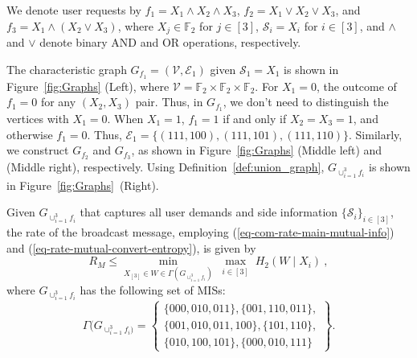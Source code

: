 \documentclass[conference, letterpaper]{IEEEtran} %
\begin{document}
\begin{ex}
\label{ex-nonlinear-comp}
We denote user requests by $f_1=X_1\wedge X_2\wedge X_3$, $f_2=X_1\vee X_2\vee X_3$, and $f_3=X_1\wedge(X_2\vee X_3)$, where $X_{j}\in\mathbb{F}_2$ for $j\in[3]$, $\mathcal{S}_{i}=X_{i}$ for $i\in [3]$, and $\wedge$ and $\vee$ denote binary AND and OR operations, respectively. 

The characteristic graph $G_{f_{1}}=(\mathcal{V},\mathcal{E}_1)$ 
given $\mathcal{S}_1=X_1$ is shown in Figure~\ref{fig:Graphs} (Left), where $\mathcal{V}=\mathbb{F}_2\times\mathbb{F}_2\times\mathbb{F}_2$. For $X_1=0$, the outcome of $f_1 =0$ for any $(X_2,X_3)$ pair. Thus, in $G_{f_{1}}$, we don't need to distinguish the vertices with $X_1=0$. When $X_1=1$, $f_1 =1$ if and only if $X_2=X_3=1$, and otherwise $f_1=0$. Thus, $\mathcal{E}_1=\{(111,100), (111,101),(111,110)\}$. 
Similarly, we construct $G_{f_{2}}$ and $G_{f_{3}}$, as shown in Figure~\ref{fig:Graphs} (Middle left) and (Middle right), respectively. Using Definition~\ref{def:union_graph},  $G_{\cup_{i=1}^{3}f_i}$ is shown in Figure~\ref{fig:Graphs}~(Right).



Given $G_{\cup_{i=1}^{3}f_i}$ that captures all user demands and side information $\{\mathcal{S}_i\}_{i\in[3]}$, the rate of the broadcast message, employing (\ref{eq-com-rate-main-mutual-info}) and (\ref{eq-rate-mutual-convert-entropy}), is given by 
\begin{equation}
\label{R-3-user}
    R_M\leq\min_{X_{[3]}\in W\in \Gamma(G_{\cup_{i=1}^{3}f_i})} \max_{{\begin{array}{c}
         i\in[3]
    \end{array}}}H_2(W\mid X_{i}) \ ,
\end{equation}
where $G_{\cup_{i=1}^{3}f_i}$ has the following set of MISs:
 \begin{equation}
 \label{Gamma-3-user}
\Gamma(G_{\cup_{i=1}^{3}f_i)}=\left\{\begin{array}{c}
       \{000,010,011\},\{001,110,011\},\\
       \{001,010,011,100\}, \{101,110\},\\ \{ 010,100,101\},
       \{000,010,111\}
  \end{array}\right\}.
  \end{equation}
    

\end{ex}
\end{document}
